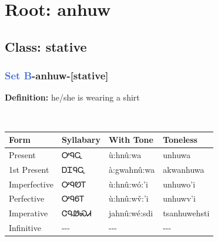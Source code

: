 \needspace{4in}
\section*{Root: anhuw}
\nopagebreak
{}
\needspace{3in}
\subsection*{Class: stative}
\nopagebreak
\needspace{2in}
\subsubsection*{\textcolor{RoyalBlue}{Set B}{-}\textbf{anhuw}{-}[stative]}
\nopagebreak
\textbf{Definition: } he/she is wearing a shirt
\\[0.5em]
\begin{tabularx}{\textwidth}{l X X X}%
\toprule%
\textbf{Form}&\textbf{Syllabary}&\textbf{With Tone}&\textbf{Toneless}\\%
\midrule%
Present&ᎤᏄᏩ&ù:hnû:wa&unhuwa\\%
1st Present&ᎠᏆᏄᏩ&à:gwahnû:wa&akwanhuwa\\%
Imperfective&ᎤᏄᏬᎢ&ù:hnû:wó:’i&unhuwo'i\\%
Perfective&ᎤᏄᏮᎢ&ù:hnû:wv̌:’i&unhuwv'i\\%
Imperative&ᏣᏄᏪᏍᏗ&jahnû:wé:sdi&tsanhuwehsti\\%
Infinitive&{-}{-}{-}&{-}{-}{-}&{-}{-}{-}\\%
\bottomrule%
\end{tabularx}
\\[1em]
